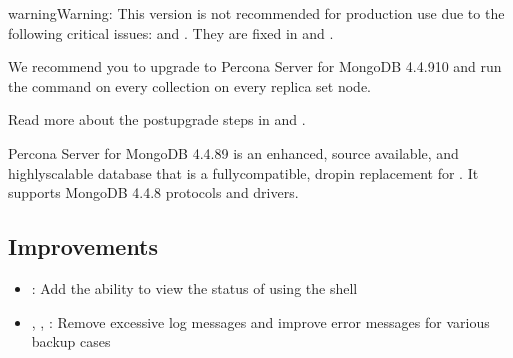 \documentclass[letterpaper,10pt,english]{sphinxmanual}
\begin{document}
\begin{sphinxadmonition}{warning}{Warning:}
\sphinxAtStartPar
This version is not recommended for production use due to the following critical issues:  and . They are fixed in  and {\hyperref[\detokenize{release_notes/4.4.9-10:psmdb-4-4-9-10}]{}}.

\sphinxAtStartPar
We recommend you to upgrade to Percona Server for MongoDB 4.4.9\sphinxhyphen{}10 and run the  command on every collection on every replica set node.

\sphinxAtStartPar
Read more about the  post\sphinxhyphen{}upgrade steps in  and .
\end{sphinxadmonition}

\sphinxAtStartPar
Percona Server for MongoDB 4.4.8\sphinxhyphen{}9 is an enhanced, source available, and highly\sphinxhyphen{}scalable database that is a
fully\sphinxhyphen{}compatible, drop\sphinxhyphen{}in replacement for .
It supports MongoDB 4.4.8 protocols and drivers.


\subsection{Improvements}
\label{\detokenize{release_notes/4.4.8-9:improvements}}\begin{itemize}
\item {} 
\sphinxAtStartPar
{}: Add the ability to view the status of {\hyperref[\detokenize{hot-backup:hot-backup}]{}} using the  shell

\item {} 
\sphinxAtStartPar
{}, , : Remove excessive log messages and improve error messages for various backup cases

\end{itemize}
\end{document}
